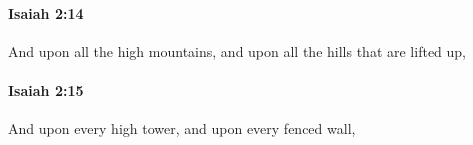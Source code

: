 		\paragraph{Isaiah 2:14} %
			\label{ISAIAH-2-14}

			And upon all the high mountains, and upon all the hills that are lifted up,


		\paragraph{Isaiah 2:15} %
			\label{ISAIAH-2-15}

			And upon every high tower, and upon every fenced wall,


